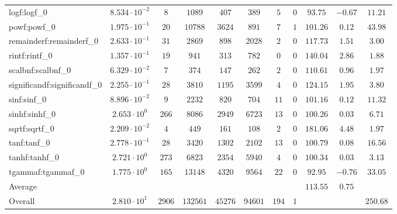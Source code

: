 \begin{tabular}{|l|c|c|c|c|c|c|c|c|c|c|}
logf:logf\_0                 & $ 8.534 \cdot 10^{-2} $ & $ 8      $ & $ 1089   $ & $ 407   $ & $ 389   $ & $ 5   $ & $ 0 $ & $ 93.75       $ & $ -0.67   $ & $ 11.21   $ \\
powf:powf\_0                 & $ 1.975 \cdot 10^{-1} $ & $ 20     $ & $ 10788  $ & $ 3624  $ & $ 891   $ & $ 7   $ & $ 1 $ & $ 101.26      $ & $ 0.12    $ & $ 43.98   $ \\
remainderf:remainderf\_0     & $ 2.633 \cdot 10^{-1} $ & $ 31     $ & $ 2869   $ & $ 898   $ & $ 2028  $ & $ 2   $ & $ 0 $ & $ 117.73      $ & $ 1.51    $ & $ 3.00    $ \\
rintf:rintf\_0               & $ 1.357 \cdot 10^{-1} $ & $ 19     $ & $ 941    $ & $ 313   $ & $ 782   $ & $ 0   $ & $ 0 $ & $ 140.04      $ & $ 2.86    $ & $ 1.88    $ \\
scalbnf:scalbnf\_0           & $ 6.329 \cdot 10^{-2} $ & $ 7      $ & $ 374    $ & $ 147   $ & $ 262   $ & $ 2   $ & $ 0 $ & $ 110.61      $ & $ 0.96    $ & $ 1.97    $ \\
significandf:significandf\_0 & $ 2.255 \cdot 10^{-1} $ & $ 28     $ & $ 3810   $ & $ 1195  $ & $ 3599  $ & $ 4   $ & $ 0 $ & $ 124.15      $ & $ 1.95    $ & $ 3.80    $ \\
sinf:sinf\_0                 & $ 8.896 \cdot 10^{-2} $ & $ 9      $ & $ 2232   $ & $ 820   $ & $ 704   $ & $ 11  $ & $ 0 $ & $ 101.16      $ & $ 0.12    $ & $ 11.32   $ \\
sinhf:sinhf\_0               & $ 2.653 \cdot 10^{0}  $ & $ 266    $ & $ 8086   $ & $ 2949  $ & $ 6723  $ & $ 13  $ & $ 0 $ & $ 100.26      $ & $ 0.03    $ & $ 6.71    $ \\
sqrtf:sqrtf\_0               & $ 2.209 \cdot 10^{-2} $ & $ 4      $ & $ 449    $ & $ 161   $ & $ 108   $ & $ 2   $ & $ 0 $ & $ 181.06      $ & $ 4.48    $ & $ 1.97    $ \\
tanf:tanf\_0                 & $ 2.778 \cdot 10^{-1} $ & $ 28     $ & $ 3420   $ & $ 1302  $ & $ 2102  $ & $ 13  $ & $ 0 $ & $ 100.79      $ & $ 0.08    $ & $ 16.56   $ \\
tanhf:tanhf\_0               & $ 2.721 \cdot 10^{0}  $ & $ 273    $ & $ 6823   $ & $ 2354  $ & $ 5940  $ & $ 4   $ & $ 0 $ & $ 100.34      $ & $ 0.03    $ & $ 3.13    $ \\
tgammaf:tgammaf\_0           & $ 1.775 \cdot 10^{0}  $ & $ 165    $ & $ 13148  $ & $ 4320  $ & $ 9564  $ & $ 22  $ & $ 0 $ & $ 92.95       $ & $ -0.76   $ & $ 33.05   $ \\
\hline
Average                      & $                     $ & $        $ & $        $ & $       $ & $       $ & $     $ & $   $ & $ 113.55      $ & $ 0.75    $ & $         $ \\
\hline
Overall                      & $ 2.810 \cdot 10^{1}  $ & $ 2906   $ & $ 132561 $ & $ 45276 $ & $ 94601 $ & $ 194 $ & $ 1 $ & $             $ & $         $ & $ 250.68  $ \\
\hline
\end{tabular}
